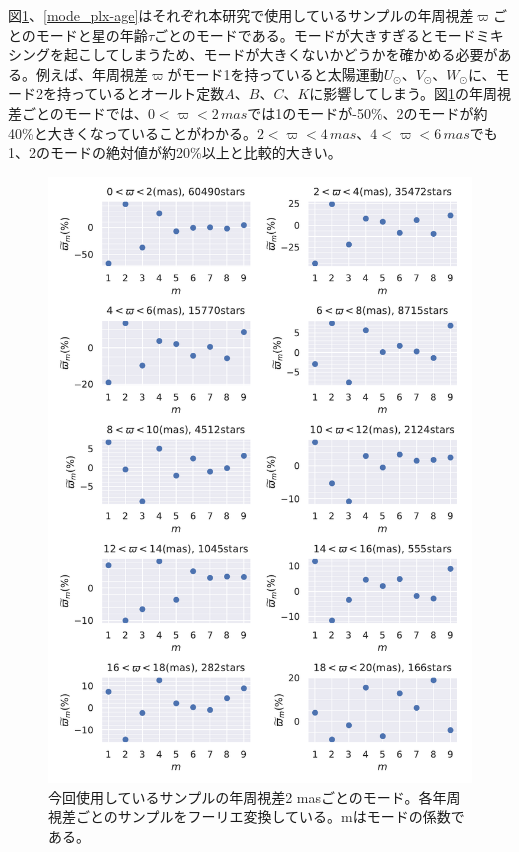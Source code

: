 図\ref{mode_plx}、\ref{mode_plx-age}はそれぞれ本研究で使用しているサンプルの年周視差$\varpi$ごとのモードと星の年齢$\tau$ごとのモードである。モードが大きすぎるとモードミキシングを起こしてしまうため、モードが大きくないかどうかを確かめる必要がある。例えば、年周視差$\varpi$がモード1を持っていると太陽運動$U_{\odot}、V_{\odot}、W_{\odot}$に、モード2を持っているとオールト定数$A、B、C、K$に影響してしまう。図\ref{mode_plx}の年周視差ごとのモードでは、$0<\varpi<2\,\si{mas}$では1のモードが-50\%、2のモードが約40\%と大きくなっていることがわかる。$2<\varpi<4\,\si{mas}$、$4<\varpi<6\,\si{mas}$でも1、2のモードの絶対値が約20\%以上と比較的大きい。

\begin{figure}[htbp]
\begin{center}
	\includegraphics[width=12cm]{fig/mode_plx.pdf}
	\caption{今回使用しているサンプルの年周視差2 masごとのモード。各年周視差ごとのサンプルをフーリエ変換している。mはモードの係数である。}
	\label{mode_plx}
\end{center}
\end{figure}

